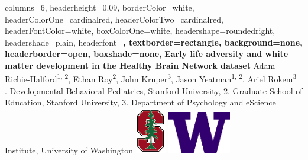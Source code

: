 \documentclass[a0paper,landscape,fontscale=0.385]{baposter}
\begin{document}
\begin{poster}{
    columns=6,
    headerheight=0.09\textheight,
    borderColor=white, %
    headerColorOne=cardinalred, %
    headerColorTwo=cardinalred, %
    headerFontColor=white, %
    boxColorOne=white, %
    headershape=roundedright, %
    headershade=plain, %
    headerfont=\Large\sf\bf, %
    textborder=rectangle,
    background=none,
    headerborder=open, %
    boxshade=none,
}
{}
%
%
{\sf\bf %
Early life adversity and white matter development %
in the Healthy Brain Network dataset
\hfill %
\null %
} %
{%
    \vspace{0.4em}
    Adam Richie-Halford\textsuperscript{1, 2}, %
    Ethan Roy\textsuperscript{2}, %
    John Kruper\textsuperscript{3}, %
    Jason Yeatman\textsuperscript{1, 2}, %
    Ariel Rokem\textsuperscript{3} \hfill \null \\
    {. Developmental-Behavioral Pediatrics, Stanford University, %
        2. Graduate School of Education, Stanford University, %
        3. Department of Psychology and eScience Institute, University of Washington %
        \hfill \null
    }
} %
{%
\includegraphics[align=c,height=2.00cm]{logos/stanford_logo.png}%
\hspace{0.25em}
\includegraphics[align=c,height=1.85cm]{logos/UWlogo.png}%
} %


\end{poster}
\end{document}
